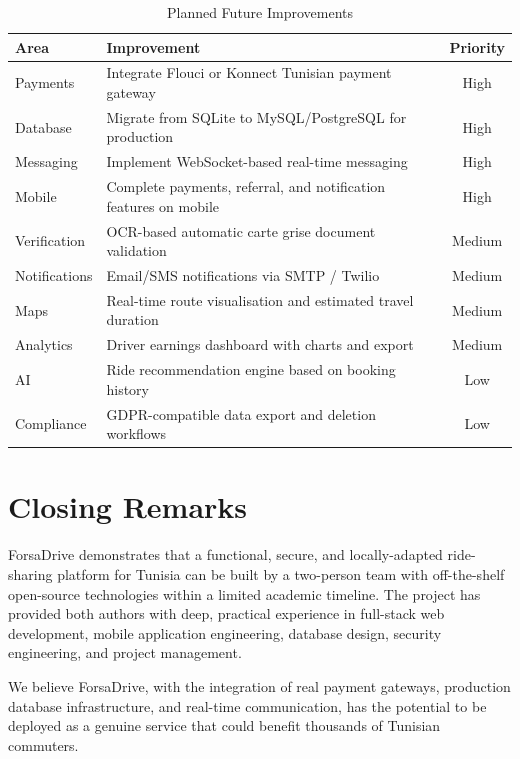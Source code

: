 \documentclass[12pt,a4paper,openright]{report}
\begin{document}
\begin{table}[H]
\centering
\caption{Planned Future Improvements}
\label{tab:future}
\begin{tabularx}{\textwidth}{l X c}
\toprule
\textbf{Area} & \textbf{Improvement} & \textbf{Priority} \\
\midrule
Payments & Integrate Flouci or Konnect Tunisian payment gateway & High \\
Database & Migrate from SQLite to MySQL/PostgreSQL for production & High \\
Messaging & Implement WebSocket-based real-time messaging & High \\
Mobile & Complete payments, referral, and notification features on mobile & High \\
Verification & OCR-based automatic carte grise document validation & Medium \\
Notifications & Email/SMS notifications via SMTP / Twilio & Medium \\
Maps & Real-time route visualisation and estimated travel duration & Medium \\
Analytics & Driver earnings dashboard with charts and export & Medium \\
AI & Ride recommendation engine based on booking history & Low \\
Compliance & GDPR-compatible data export and deletion workflows & Low \\
\bottomrule
\end{tabularx}
\end{table}

\section{Closing Remarks}

ForsaDrive demonstrates that a functional, secure, and locally-adapted ride-sharing platform for Tunisia can be built by a two-person team with off-the-shelf open-source technologies within a limited academic timeline. The project has provided both authors with deep, practical experience in full-stack web development, mobile application engineering, database design, security engineering, and project management.

We believe ForsaDrive, with the integration of real payment gateways, production database infrastructure, and real-time communication, has the potential to be deployed as a genuine service that could benefit thousands of Tunisian commuters.
\end{document}
